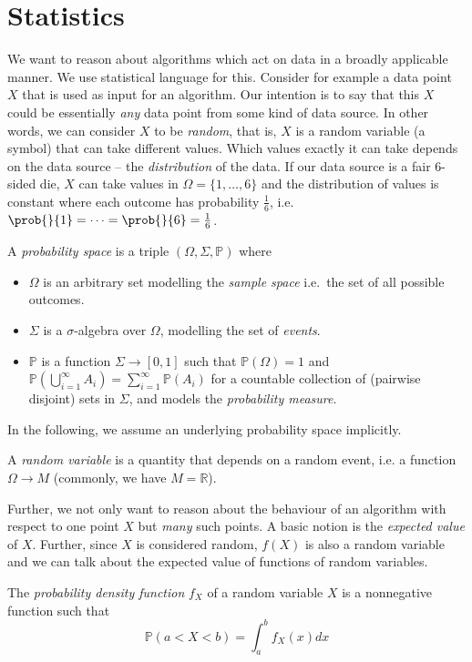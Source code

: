 \documentclass[
    a4paper, %
	fontsize=10pt, %
	twoside=false, %
]{kaobook}
\begin{document}


\section{Statistics}

We want to reason about algorithms which act on data in a broadly applicable manner. We use statistical language for this. Consider for example a data point $X$ that is used as input for an algorithm. Our intention is to say that this $X$ could be essentially \textit{any} data point from some kind of data source. In other words, we can consider $X$ to be \textit{random}, that is, $X$ is a random variable (a symbol) that can take different values. 
Which values exactly it can take depends on the data source -- the \textit{distribution} of the data. If our data source is a fair $6$-sided die, $X$ can take values in $\Omega = \{ 1, \dots, 6 \}$ and the distribution of values is constant where each outcome has probability $\frac{1}{6}$, i.e. $\prob{}{1} = \dots  = \prob{}{6} = \frac{1}{6}$.
\begin{definition}
  A \textit{probability space} is a triple \((\Omega, \Sigma, \mathbb{P})\)
  where
  \begin{itemize}
  \item \(\Omega\) is an arbitrary set modelling the \textit{sample space}
    i.e.~the set of all possible outcomes.
  \item \(\Sigma\) is a \(\sigma\)-algebra
    over \(\Omega\), modelling the set of \textit{events}.
    \item \(\mathbb{P}\) is a function
    \(\Sigma \to [0,1]\) such that \(\mathbb{P}(\Omega)=1\) and
    \(\mathbb{P}\left( \bigcup_{i=1}^\infty A_{i} \right) = \sum_{i=1}^\infty
    \mathbb{P}(A_{i})\) for a countable collection of (pairwise disjoint) sets
    in \(\Sigma\), and models the \textit{probability measure}.
  \end{itemize}
\end{definition}
In the following, we assume an underlying probability space implicitly.
\begin{definition}
  A \textit{random variable} is a quantity
  that depends on a random event, i.e. a function \(\Omega
  \to M\) (commonly, we have \(M=\mathbb{R}\)).
\end{definition}
Further, we not only want to reason about the behaviour of an algorithm with respect to one point $X$ but \textit{many} such points. A basic notion is the \textit{expected value} of $X$. Further, since $X$ is considered random, $f(X)$ is also a random variable and we can talk about the expected value of functions of random variables.
\begin{definition}
  The \textit{probability density function} $f_X$ of a random variable $X$ is a
  nonnegative function such that
  $$
  \mathbb{P}(a < X < b) = \int_a^b f_X(x) dx
  $$
\end{definition} 
\end{document}
